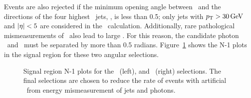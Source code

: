 Events are also rejected if the minimum opening angle between \ptvecmiss\ and the directions of the four highest \pt\ jets, \mindphijmet, is less than 0.5; only jets with $p_{\mathrm{T}} > 30\,\text{Ge\hspace{-.08em}V}$ and $\lvert \eta \rvert < 5$ are considered in the \mindphijmet\ calculation. 
Additionally, rare pathological mismeasurements of \ETg\ also lead to large \met. 
For this reason, the candidate photon \ptvec\ and \ptvecmiss\ must be separated by more than 0.5 radians.
Figure~\ref{fig:n-1} shows the N-1 plots in the signal region for these two angular selections.

\begin{figure}[htbp]
  \centering
  \caption{
    Signal region N-1 plots for the \mindphijmet\ (left), and \dphigmet\ (right) selections.
    The final selections are chosen to reduce the rate of events with artificial \met\ from energy mismeasurement of jets and photons.
  }
  \label{fig:n-1}
\end{figure}

